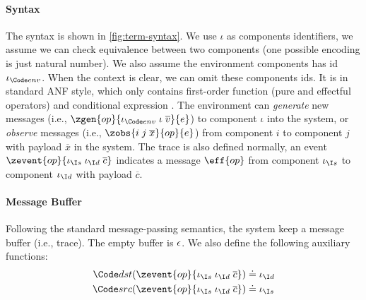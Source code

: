 \paragraph{Syntax} The syntax is shown in \autoref{fig:term-syntax}. We use $\iota$ as components identifiers, we assume we can check equivalence between two components (one possible encoding is just natural number). We also assume the environment components has id $\envI$. When the context is clear, we can omit these components ids.
It is in standard ANF style, which only contains first-order function (pure and effectful operators) and conditional expression .
The environment can \emph{generate} new messages (i.e., $\zgen{op}{\envI\;\iota\;\overline{v}}{e}$) to component $\iota$ into the system, or \emph{observe} messages (i.e., $\zobs{i\;j\;\overline{x}}{op}{e}$) from component $i$ to component $j$ with payload $\overline{x}$ in the system. The trace is also defined normally, an event $\zevent{op}{\srcI\;\dstI\;\overline{c}}$ indicates a message $\eff{op}$ from component $\srcI$ to component $\dstI$ with payload $\overline{c}$.

\paragraph{Message Buffer} Following the standard message-passing semantics, the system keep a message buffer (i.e., trace). The empty buffer is $\epsilon$. We also define the following auxiliary functions:
\begin{align*}
    \dst{\zevent{op}{\srcI\;\dstI\;\overline{c}}} &\doteq \dstI \\
    \src{\zevent{op}{\srcI\;\dstI\;\overline{c}}} &\doteq \srcI \\
\end{align*}

